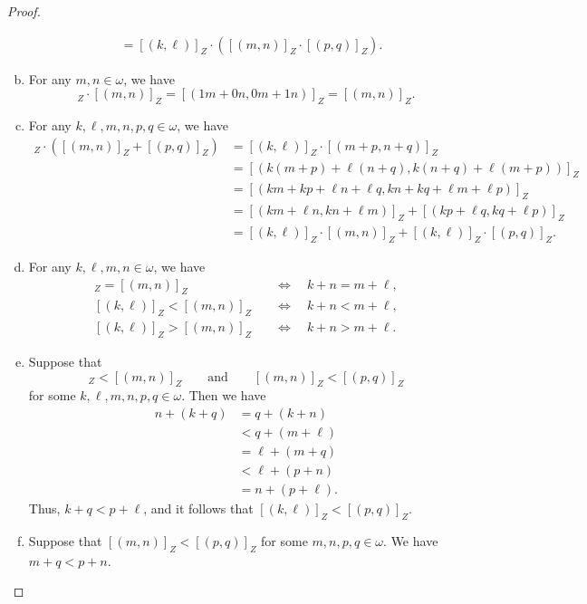 \documentclass[11pt]{article}
\begin{document}
\begin{proof}
\begin{enumerate}[(a)]
\begin{align*}
      &= [(k, \ell)]_Z \cdot ([(m, n)]_Z \cdot [(p, q)]_Z).
    \end{align*}
    \item For any $m, n \in \omega$, we have
    \begin{equation*}
      [(1, 0)]_Z \cdot [(m, n)]_Z = [(1m + 0n, 0m + 1n)]_Z = [(m, n)]_Z.
    \end{equation*}
    \item For any $k, \ell, m, n, p, q \in \omega$, we have
    \begin{align*}
      [(k, \ell)]_Z \cdot ([(m, n)]_Z + [(p, q)]_Z)
      &= [(k, \ell)]_Z \cdot [(m + p, n + q)]_Z \\
      &= [(k(m+p) + \ell(n+q), k(n+q) + \ell(m+p))]_Z \\
      &= [(km+kp+\ell n+\ell q, kn+kq+\ell m+\ell p)]_Z \\
      &= [(km+\ell n, kn+\ell m)]_Z + [(kp+\ell q, kq+\ell p)]_Z \\
      &= [(k, \ell)]_Z \cdot [(m, n)]_Z + [(k, \ell)]_Z \cdot [(p, q)]_Z.
    \end{align*}
    \item For any $k, \ell, m, n \in \omega$, we have
    \begin{align*}
      [(k, \ell)]_Z = [(m, n)]_Z \quad &\iff \quad k + n = m + \ell, \\
      [(k, \ell)]_Z < [(m, n)]_Z \quad &\iff \quad k + n < m + \ell, \\
      [(k, \ell)]_Z > [(m, n)]_Z \quad &\iff \quad k + n > m + \ell.
    \end{align*}
    \item Suppose that
    \begin{equation*}
      [(k, \ell)]_Z < [(m, n)]_Z \qquad \text{and} \qquad [(m, n)]_Z < [(p, q)]_Z
    \end{equation*}
    for some $k, \ell, m, n, p, q \in \omega$.
    Then we have
    \begin{align*}
      n + (k + q)
      &= q + (k + n) \\
      &< q + (m + \ell) \\
      &= \ell + (m + q) \\
      &< \ell + (p + n) \\
      &= n + (p + \ell).
    \end{align*}
    Thus, $k + q < p + \ell$, and it follows that $[(k, \ell)]_Z < [(p, q)]_Z$.
    \item Suppose that $[(m, n)]_Z < [(p, q)]_Z$ for some $m, n, p, q \in \omega$.
    We have $m + q < p + n$.

\end{enumerate}
\end{proof}
\end{document}
